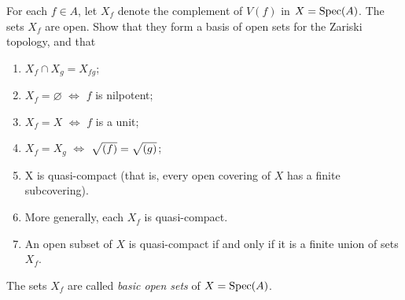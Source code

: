 \documentclass{article}
\begin{document}
\begin{exercise} \label{ex1-17}
    For each \(f \in A\), let \(X_f\) denote the complement of \(V(f)\) in \(X = \operatorname{Spec}(A)\).
    The sets \(X_f\) are open.
    Show that they form a basis of open sets for the Zariski topology, and that
    \begin{enumerate}
        \item
            \(X_f \cap X_g = X_{fg}\);
        \item
            \(X_f = \varnothing\) \(\iff\) \(f\) is nilpotent;
        \item
            \(X_f = X\) \(\iff\) \(f\) is a unit;
        \item
            \(X_f = X_g\) \(\iff\) \(\sqrt{(f)} = \sqrt{(g)}\);
        \item
            X is quasi-compact (that is, every open covering of \(X\) has a finite subcovering).
        \item
            More generally, each \(X_f\) is quasi-compact.
        \item
            An open subset of \(X\) is quasi-compact if and only if it is a finite union of sets \(X_f\).
    \end{enumerate}
    The sets \(X_f\) are called \textit{basic open sets} of \(X = \operatorname{Spec}(A)\).
\end{exercise}
\end{document}
